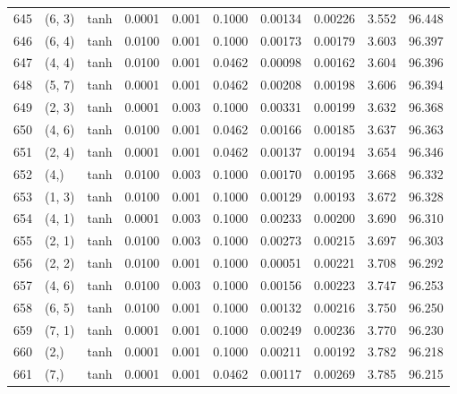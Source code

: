 \begin{tabular}{lllrrrrrrr}
645 &      (6, 3) &      tanh &  0.0001 &  0.001 &  0.1000 &          0.00134 &    0.00226 &       3.552 &    96.448 \\
646 &      (6, 4) &      tanh &  0.0100 &  0.001 &  0.1000 &          0.00173 &    0.00179 &       3.603 &    96.397 \\
647 &      (4, 4) &      tanh &  0.0100 &  0.001 &  0.0462 &          0.00098 &    0.00162 &       3.604 &    96.396 \\
648 &      (5, 7) &      tanh &  0.0001 &  0.001 &  0.0462 &          0.00208 &    0.00198 &       3.606 &    96.394 \\
649 &      (2, 3) &      tanh &  0.0001 &  0.003 &  0.1000 &          0.00331 &    0.00199 &       3.632 &    96.368 \\
650 &      (4, 6) &      tanh &  0.0100 &  0.001 &  0.0462 &          0.00166 &    0.00185 &       3.637 &    96.363 \\
651 &      (2, 4) &      tanh &  0.0001 &  0.001 &  0.0462 &          0.00137 &    0.00194 &       3.654 &    96.346 \\
652 &        (4,) &      tanh &  0.0100 &  0.003 &  0.1000 &          0.00170 &    0.00195 &       3.668 &    96.332 \\
653 &      (1, 3) &      tanh &  0.0100 &  0.001 &  0.1000 &          0.00129 &    0.00193 &       3.672 &    96.328 \\
654 &      (4, 1) &      tanh &  0.0001 &  0.003 &  0.1000 &          0.00233 &    0.00200 &       3.690 &    96.310 \\
655 &      (2, 1) &      tanh &  0.0100 &  0.003 &  0.1000 &          0.00273 &    0.00215 &       3.697 &    96.303 \\
656 &      (2, 2) &      tanh &  0.0100 &  0.001 &  0.1000 &          0.00051 &    0.00221 &       3.708 &    96.292 \\
657 &      (4, 6) &      tanh &  0.0100 &  0.003 &  0.1000 &          0.00156 &    0.00223 &       3.747 &    96.253 \\
658 &      (6, 5) &      tanh &  0.0100 &  0.001 &  0.1000 &          0.00132 &    0.00216 &       3.750 &    96.250 \\
659 &      (7, 1) &      tanh &  0.0001 &  0.001 &  0.1000 &          0.00249 &    0.00236 &       3.770 &    96.230 \\
660 &        (2,) &      tanh &  0.0001 &  0.001 &  0.1000 &          0.00211 &    0.00192 &       3.782 &    96.218 \\
661 &        (7,) &      tanh &  0.0001 &  0.001 &  0.0462 &          0.00117 &    0.00269 &       3.785 &    96.215 \\

\end{tabular}
